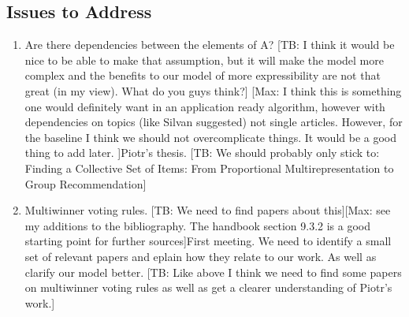 \documentclass[10pt,a4paper, english]{article}
\newcommand{\haukur}[1]{\textcolor[rgb]{.8,.33,.0}{[TB: #1]}}%
\newcommand{\Max}[2]{\textcolor[rgb]{.15,.73,.12}{[Max: #1]}}%
\begin{document}
\begin{enumerate}
\section{Issues to Address}
\begin{enumerate}
\item Are there dependencies between the elements of A? \haukur{I think it would be nice to be able to make that assumption, but it will make the model more complex and the benefits to our model of more expressibility are not that great (in my view). What do you guys think?} \Max{I think this is something one would definitely want in an application ready algorithm, however with dependencies on topics (like Silvan suggested) not single articles. However, for the baseline I think we should not overcomplicate things. It would be a good thing to add later. }
\item Piotr's thesis. \haukur{We should probably only stick to: Finding a Collective Set of Items: From Proportional Multirepresentation to Group Recommendation}
\item Multiwinner voting rules. \haukur{We need to find papers about this}\Max{see my additions to the bibliography. The handbook section 9.3.2 is a good starting point for further sources}
\item First meeting. We need to identify a small set of relevant papers and eplain how they relate to our work. As well as clarify our model better. \haukur{Like above I think we need to find some papers on multiwinner voting rules as well as get a clearer understanding of Piotr's work.}
\end{enumerate}

\end{enumerate}
\end{document}

